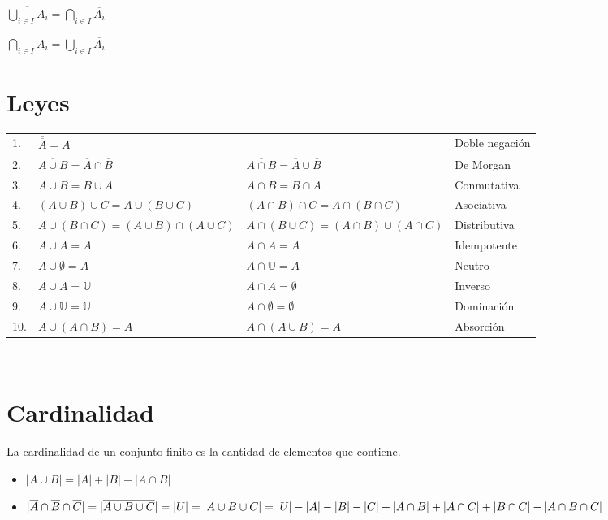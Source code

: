 \documentclass[11pt,a4paper]{article}
\begin{document}
\begin{itemize}
\begin{multicols}{2}
\item $\overline{\displaystyle{\bigcup_{i \in I} A_i}} = \displaystyle{\bigcap_{i \in I} \overline{A_i}}$
\item $\overline{\displaystyle{\bigcap_{i \in I} A_i}} = \displaystyle{\bigcup_{i \in I} \overline{A_i}}$
\end{multicols}
\end{itemize}
\noindent \dotfill

\newpage
\section{Leyes}
\begin{tabular}{p{}p{}p{}p{}}
1. & $\overline{\overline{A}} = A$ & & Doble negaci\'on \\
2. & $\overline{A \cup B} = \overline{A} \cap \overline{B}$ & $\overline{A \cap B} = \overline{A} \cup \overline{B}$ & De Morgan \\
3. & $A \cup B = B \cup A$ & $A \cap B = B \cap A$ & Conmutativa \\
4. & $(A\cup B) \cup C = A \cup (B \cup C)$ & $(A\cap B) \cap C = A \cap (B \cap C)$ & Asociativa \\
5. & $A \cup (B \cap C) = (A \cup B) \cap (A \cup C)$ & $A \cap (B \cup C) = (A \cap B) \cup (A \cap C)$ & Distributiva \\
6. & $A \cup A = A$ & $A \cap A = A$ & Idempotente \\
7. & $A \cup \emptyset = A$ & $A \cap \mathbb{U} = A$ & Neutro \\
8. & $A \cup \overline{A} = \mathbb{U}$ & $A \cap \overline{A} = \emptyset$ & Inverso \\
9. & $A \cup \mathbb{U} = \mathbb{U}$ & $A \cap \emptyset = \emptyset$ & Dominaci\'on \\
10. & $A \cup (A \cap B) = A$ & $A \cap (A \cup B) = A$ & Absorci\'on \\
\end{tabular}

\vspace{1cm}
\noindent \dotfill\\

\section{Cardinalidad}
La cardinalidad de un conjunto finito es la cantidad de elementos que contiene.
\begin{itemize}
\item $|A\cup B| = |A| + |B| - |A \cap B|$
\item $|\overline{A} \cap \overline{B} \cap \overline{C}| = |\overline{A \cup B \cup C}| = |U| = |A \cup B \cup C|\\ = |U| - |A| - |B| - |C| + |A \cap B| + |A \cap C| + |B \cap C| - |A \cap B \cap C|$
\end{itemize}
\end{document}
